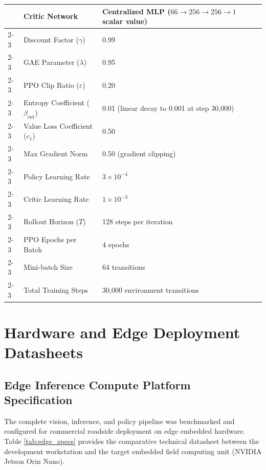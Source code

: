 \begin{table}[htbp]
\begin{tabularx}{\textwidth}{|p{3.5cm}|p{4.2cm}|X|}
& Critic Network & Centralized MLP ($66 \rightarrow 256 \rightarrow 256 \rightarrow 1$ scalar value) \\ \cline{2-3}
& Discount Factor ($\gamma$) & 0.99 \\ \cline{2-3}
& GAE Parameter ($\lambda$) & 0.95 \\ \cline{2-3}
& PPO Clip Ratio ($\varepsilon$) & 0.20 \\ \cline{2-3}
& Entropy Coefficient ($\beta_{\text{ent}}$) & 0.01 (linear decay to 0.001 at step 30,000) \\ \cline{2-3}
& Value Loss Coefficient ($c_1$) & 0.50 \\ \cline{2-3}
& Max Gradient Norm & 0.50 (gradient clipping) \\ \cline{2-3}
& Policy Learning Rate & $3 \times 10^{-4}$ \\ \cline{2-3}
& Critic Learning Rate & $1 \times 10^{-3}$ \\ \cline{2-3}
& Rollout Horizon ($T$) & 128 steps per iteration \\ \cline{2-3}
& PPO Epochs per Batch & 4 epochs \\ \cline{2-3}
& Mini-batch Size & 64 transitions \\ \cline{2-3}
& Total Training Steps & 30,000 environment transitions \\ \hline
\end{tabularx}
\end{table}

\chapter{Hardware and Edge Deployment Datasheets}
\label{app:datasheets}

\section{Edge Inference Compute Platform Specification}
The complete vision, inference, and policy pipeline was benchmarked and configured for commercial roadside deployment on edge embedded hardware. Table \ref{tab:edge_specs} provides the comparative technical datasheet between the development workstation and the target embedded field computing unit (NVIDIA Jetson Orin Nano).

